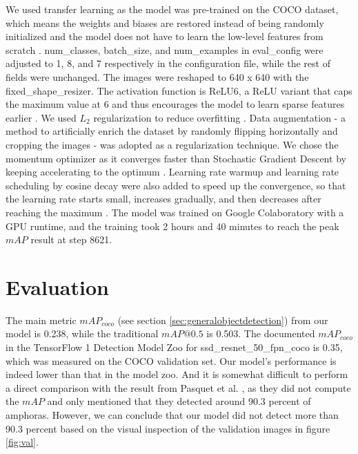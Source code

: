 \documentclass[a4paper, 11pt, oneside]{article}
\begin{document}
We used transfer learning \cite{torrey2010transfer} as the model was pre-trained on the COCO dataset, which means the
weights and biases are restored instead of being randomly initialized and the model does not have to learn the low-level
features from scratch \cite{geron2019hands}. num\_classes, batch\_size, and num\_examples in eval\_config were adjusted
to 1, 8, and 7 respectively in the configuration file, while the rest of fields were unchanged. The images were reshaped
to 640 x 640 with the fixed\_shape\_resizer. The activation function is ReLU6, a ReLU variant that caps the maximum value
at 6 and thus encourages the model to learn sparse features earlier \cite{krizhevsky2010convolutional}. We used $L_2$
regularization \cite{ng2004feature} to reduce overfitting \cite{hawkins2004problem}. Data augmentation
\cite{krizhevsky2012imagenet} - a method to artificially enrich the dataset by randomly flipping horizontally and cropping
the images - was adopted as a regularization technique. We chose the momentum optimizer \cite{polyak1964some} as it
converges faster than Stochastic Gradient Descent \cite{bottou2010large} by keeping accelerating to the optimum
\cite{geron2019hands}. Learning rate warmup and learning rate scheduling by cosine decay were also added to speed up the
convergence, so that the learning rate starts small, increases gradually, and then decreases after reaching the maximum
\cite{geron2019hands, goyal2017accurate, senior2013empirical, loshchilov2016sgdr}.
The model was trained on Google Colaboratory \cite{colab} with a GPU runtime, and the training took 2 hours and 40
minutes to reach the peak $mAP$ result at step 8621.

\section{Evaluation}

The main metric $mAP_{coco}$ (see section \ref{sec:generalobjectdetection}) from our model is 0.238, while the
traditional $mAP@0.5$ is 0.503. The documented $mAP_{coco}$ in the TensorFlow 1 Detection Model Zoo for
ssd\_resnet\_50\_fpn\_coco is 0.35, which was measured on the COCO validation set. Our model's performance is indeed
lower than that in the model zoo. And it is somewhat difficult to perform a direct comparison with the result from
Pasquet et al. \cite{pasquet2017amphora}, as they did not compute the $mAP$ and only mentioned that they detected
around 90.3 percent of amphoras. However, we can conclude that our model did not detect more than 90.3 percent based
on the visual inspection of the validation images in figure \ref{fig:val}.
\end{document}
